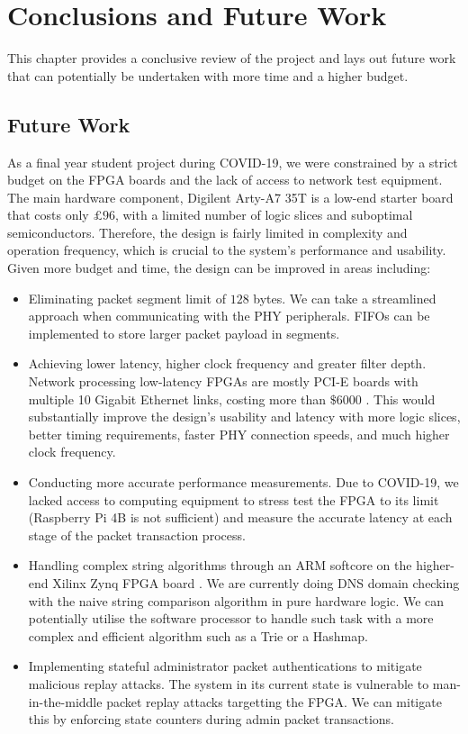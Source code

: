 \documentclass[a4paper]{report}
\begin{document}
\chapter{Conclusions and Future Work}

This chapter provides a conclusive review of the project and lays out future work that can potentially be undertaken with more time and a higher budget.

\section{Future Work}

As a final year student project during COVID-19, we were constrained by a strict budget on the FPGA boards and the lack of access to network test equipment. The main hardware component, Digilent Arty-A7 35T is a low-end starter board that costs only $£96$, with a limited number of logic slices and suboptimal semiconductors. Therefore, the design is fairly limited in complexity and operation frequency, which is crucial to the system's performance and usability. Given more budget and time, the design can be improved in areas including:

\begin{itemize}
    \item Eliminating packet segment limit of $128$ bytes. We can take a streamlined approach when communicating with the PHY peripherals. FIFOs can be implemented to store larger packet payload in segments.
    \item Achieving lower latency, higher clock frequency and greater filter depth. Network processing low-latency FPGAs are mostly PCI-E boards with multiple 10 Gigabit Ethernet links, costing more than $\$6000$ \cite{netfpga-sume-digilent}. This would substantially improve the design's usability and latency with more logic slices, better timing requirements, faster PHY connection speeds, and much higher clock frequency.
    \item Conducting more accurate performance measurements. Due to COVID-19, we lacked access to computing equipment to stress test the FPGA to its limit (Raspberry Pi 4B is not sufficient) and measure the accurate latency at each stage of the packet transaction process.
    \item Handling complex string algorithms through an ARM softcore on the higher-end Xilinx Zynq FPGA board \cite{zynq-7000-xilinx}. We are currently doing DNS domain checking with the naive string comparison algorithm in pure hardware logic. We can potentially utilise the software processor to handle such task with a more complex and efficient algorithm such as a Trie or a Hashmap.
    \item Implementing stateful administrator packet authentications to mitigate malicious replay attacks. The system in its current state is vulnerable to man-in-the-middle packet replay attacks targetting the FPGA. We can mitigate this by enforcing state counters during admin packet transactions.
\end{itemize}
\end{document}
